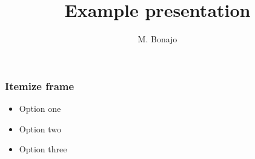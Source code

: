 \documentclass[aspectratio=169]{beamer}
\title{Example presentation}
\institute[FHTenL]{}
\author{M. Bonajo}
\begin{document}
\frame{\titlepage}

\begin{frame}
    \frametitle{Itemize frame}

    \begin{itemize}
        \item Option one
        \item Option two
        \item Option three
    \end{itemize}

\end{frame}
\end{document}

